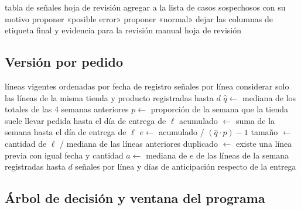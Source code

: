 \begin{algorithm}[H]
\caption{Selección de casos sospechosos y propuesta de etiqueta}
\label{alg:candidatos}
\begin{algorithmic}[1]
\Require tabla de señales
\Ensure hoja de revisión
        \State agregar a la lista de casos sospechosos con su motivo
            \State proponer «posible error»
        \Else
            \State proponer «normal»
        \EndIf
    \EndIf
\EndFor
\State dejar las columnas de etiqueta final y evidencia para la revisión manual
\State \Return hoja de revisión
\end{algorithmic}
\end{algorithm}

\subsection{Versión por pedido}

\begin{algorithm}[H]
\caption{Señales de cada línea con la información disponible al registrarla}
\label{alg:linea}
\begin{algorithmic}[1]
\Require líneas vigentes ordenadas por fecha de registro
\Ensure señales por línea
    \State considerar solo las líneas de la misma tienda y producto registradas hasta $d$
    \State $\hat q \gets$ mediana de los totales de las 4 semanas anteriores
    \State $p \gets$ proporción de la semana que la tienda suele llevar pedida hasta el día de entrega de $\ell$
    \State acumulado $\gets$ suma de la semana hasta el día de entrega de $\ell$
    \State $e \gets$ acumulado / $(\hat q \cdot p) - 1$
    \State tamaño $\gets$ cantidad de $\ell$ / mediana de las líneas anteriores
    \State duplicado $\gets$ existe una línea previa con igual fecha y cantidad
\EndFor
\State $a \gets$ mediana de $e$ de las líneas de la semana registradas hasta $d$
\State \Return señales por línea y días de anticipación respecto de la entrega
\end{algorithmic}
\end{algorithm}

\subsection{Árbol de decisión y ventana del programa}

